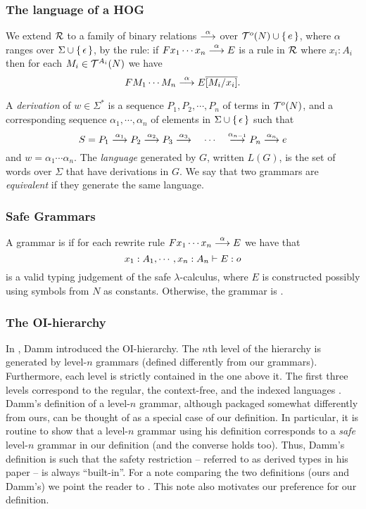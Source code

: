 \subsubsection*{The language of a HOG}
We extend $\cal R$ to a family of binary relations $\stackrel{{\alpha}}{\longrightarrow}$
over ${\cal T}^{o}(N) \cup \{\,{e}\,\}$, where $\alpha$ ranges over
$\Sigma \cup \{\,{\epsilon}\,\}$, by the rule: if $F x_1 \cdots
x_n \stackrel{{\alpha}}{\longrightarrow} E$ is a rule in $\cal R$ where $x_i : A_i$ then
for each $M_i \in {\cal T}^{A_i}(N)$ we have
\[ FM_1 \cdots M_n \stackrel{{\alpha}}{\longrightarrow} E\overline{[M_i / x_i]}. \]

A \emph{derivation} of $w \in \Sigma^\ast$ is a sequence $P_1,
P_2, \cdots, P_{n}$ of terms in ${\cal T}^{o}(N)$, and a
corresponding sequence $\alpha_1, \cdots, \alpha_n$ of elements in
$\Sigma \cup \{\,{\epsilon}\,\}$ such that
\[S = P_1 \stackrel{{\alpha_1}}{\longrightarrow} P_2 \stackrel{{\alpha_2}}{\longrightarrow} P_3 \stackrel{{\alpha_3}}{\longrightarrow}
\quad \cdots \quad \stackrel{{\alpha_{n-1}}}{\longrightarrow} P_{n} \stackrel{{\alpha_n}}{\longrightarrow} e
\] and $w = \alpha_1 \cdots \alpha_n$. The \emph{language} generated by
$G$, written $L(G)$, is the set of words over $\Sigma$ that have
derivations in $G$. We say that two grammars are \emph{equivalent}
if they generate the same language.

\subsubsection*{Safe Grammars}

A grammar is  if for each rewrite rule
$F x_1 \cdots x_n \stackrel{{\alpha}}{\longrightarrow} E$ we have that
\[ {{x_1 : A_1, \cdots, x_n : A_n} \vdash {E :
o}}\]
is a valid typing judgement of the safe $\lambda$-calculus, where $E$ is constructed possibly
using symbols from $N$ as constants. Otherwise, the grammar is .

\subsubsection*{The OI-hierarchy}

In \cite{Dam82}, Damm introduced the OI-hierarchy. The $n$th level
of the hierarchy is generated by level-$n$ grammars (defined
differently from our grammars). Furthermore,
each level is strictly contained in the one above it. The first
three levels correspond to the regular, the context-free, and the
indexed languages \cite{Aho68}. Damm's definition of a level-$n$
grammar, although packaged somewhat differently from ours, can be
thought of as a special case of our definition. In particular, it
is routine to show that a level-$n$ grammar using his definition
corresponds to a \emph{safe} level-$n$ grammar in our definition
(and the converse holds too). Thus, Damm's definition is such that
the safety restriction -- referred to as derived types in his
paper -- is always ``built-in''. For a note comparing the two
definitions (ours and Damm's) we point the reader to \cite{dMO}.
This note also motivates our preference for our definition.

